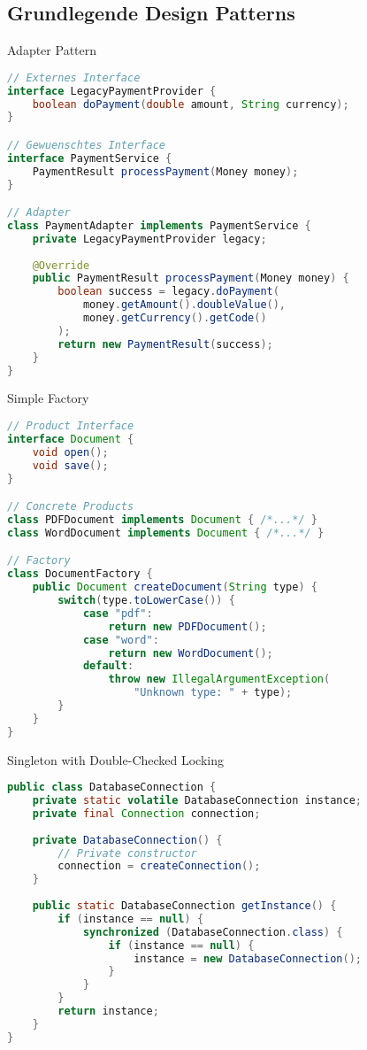 \subsection{Grundlegende Design Patterns}

\begin{example}{Adapter Pattern}
\begin{lstlisting}[language=Java]
// Externes Interface
interface LegacyPaymentProvider {
    boolean doPayment(double amount, String currency);
}

// Gewuenschtes Interface
interface PaymentService {
    PaymentResult processPayment(Money money);
}

// Adapter
class PaymentAdapter implements PaymentService {
    private LegacyPaymentProvider legacy;
    
    @Override
    public PaymentResult processPayment(Money money) {
        boolean success = legacy.doPayment(
            money.getAmount().doubleValue(),
            money.getCurrency().getCode()
        );
        return new PaymentResult(success);
    }
}
\end{lstlisting}
\end{example}

\begin{example}{Simple Factory}
\begin{lstlisting}[language=Java]
// Product Interface
interface Document {
    void open();
    void save();
}

// Concrete Products
class PDFDocument implements Document { /*...*/ }
class WordDocument implements Document { /*...*/ }

// Factory
class DocumentFactory {
    public Document createDocument(String type) {
        switch(type.toLowerCase()) {
            case "pdf": 
                return new PDFDocument();
            case "word": 
                return new WordDocument();
            default:
                throw new IllegalArgumentException(
                    "Unknown type: " + type);
        }
    }
}
\end{lstlisting}
\end{example}

\begin{example}{Singleton with Double-Checked Locking}
\begin{lstlisting}[language=Java]
public class DatabaseConnection {
    private static volatile DatabaseConnection instance;
    private final Connection connection;
    
    private DatabaseConnection() {
        // Private constructor
        connection = createConnection();
    }
    
    public static DatabaseConnection getInstance() {
        if (instance == null) {
            synchronized (DatabaseConnection.class) {
                if (instance == null) {
                    instance = new DatabaseConnection();
                }
            }
        }
        return instance;
    }
}
\end{lstlisting}
\end{example}

